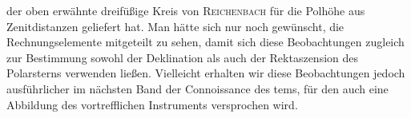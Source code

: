 der oben erwähnte dreifüßige Kreis von \textsc{Reichenbach} für die Polhöhe aus Zenitdistanzen geliefert hat. Man hätte sich nur noch gewünscht, die Rechnungselemente mitgeteilt zu sehen, damit sich diese Beobachtungen zugleich zur Bestimmung sowohl der Deklination als auch der Rektaszension des Polarsterns verwenden ließen. Vielleicht erhalten wir diese Beobachtungen jedoch ausführlicher im nächsten Band der Connoissance des tems, für den auch eine Abbildung des vortrefflichen Instruments versprochen wird.

